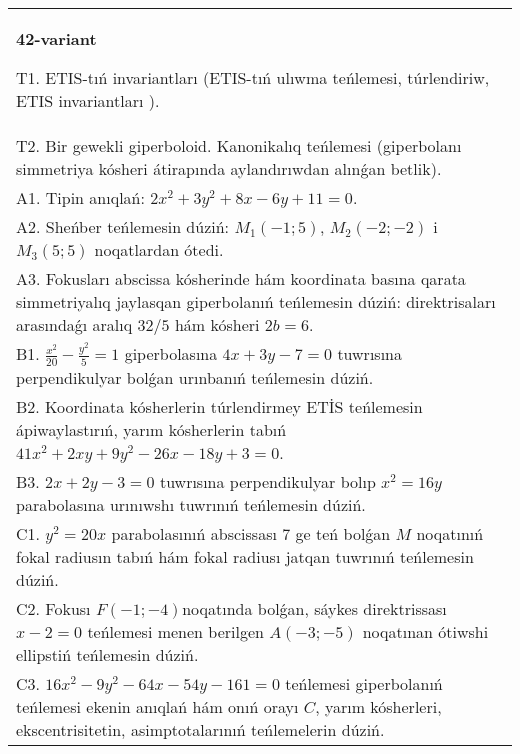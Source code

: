 \documentclass{article}
\begin{document}
\begin{tabular}{m{17cm}}
\textbf{42-variant}
\newline

T1. ETIS-tıń invariantları (ETIS-tıń ulıwma teńlemesi, túrlendiriw, ETIS invariantları ).\\

T2. Bir gewekli giperboloid. Kanonikalıq teńlemesi (giperbolanı simmetriya kósheri átirapında aylandırıwdan alınǵan betlik).\\

A1. Tipin anıqlań: $2 x^{2}+3 y^{2}+8 x-6 y+11=0$.\\

A2. Sheńber teńlemesin dúziń: $M_1 (-1;5) $, $M_2 (-2;-2) $ i $M_3 (5;5) $ noqatlardan ótedi.\\

A3. Fokusları abscissa kósherinde hám koordinata basına qarata simmetriyalıq jaylasqan giperbolanıń teńlemesin dúziń: direktrisaları arasındaǵı aralıq $32/5$ hám kósheri $2 b=6$.\\

B1. $\frac{x^{2}}{20} - \frac{y^{2}}{5} = 1$ giperbolasına $4x + 3y - 7 = 0$ tuwrısına perpendikulyar bolǵan urınbanıń teńlemesin dúziń.  \\

B2. Koordinata kósherlerin túrlendirmey ETİS teńlemesin ápiwaylastırıń, yarım kósherlerin tabıń $41x^{2} + 2xy + 9y^{2} - 26x - 18y + 3 = 0$.  \\

B3. $2x + 2y - 3 = 0$ tuwrısına perpendikulyar bolıp $x^{2} = 16y$ parabolasına urınıwshı tuwrınıń teńlemesin dúziń.  \\

C1. $y^{2} = 20x$ parabolasınıń abscissası 7 ge teń bolǵan $M$ noqatınıń fokal radiusın tabıń hám fokal radiusı jatqan tuwrınıń teńlemesin dúziń.  \\

C2. Fokusı $F( - 1; - 4)$noqatında bolǵan, sáykes direktrissası $x - 2 = 0$ teńlemesi menen berilgen $A( - 3; - 5)$ noqatınan ótiwshi ellipstiń teńlemesin dúziń.  \\

C3. $16x^{2} - 9y^{2} - 64x - 54y - 161 = 0$ teńlemesi giperbolanıń teńlemesi ekenin anıqlań hám onıń orayı $C$, yarım kósherleri, ekscentrisitetin, asimptotalarınıń teńlemelerin dúziń.  \\

\end{tabular}
\vspace{1cm}
\end{document}
